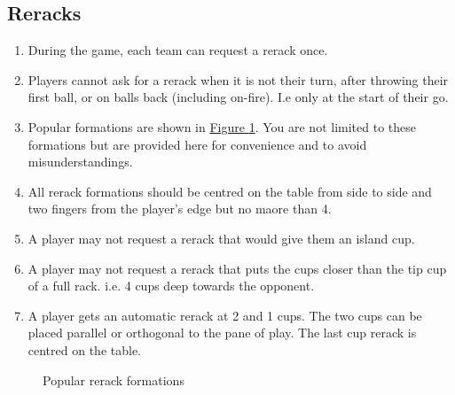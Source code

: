 	\subsection{Reracks}\label{ssec:Rerack}
		\begin{enumerate}[label=(\roman*), ref=\roman*]
            \item \label{sssec:Rerack,number} During the game, each team can request a rerack once.
            \item \label{sssec:Rerack,notallowed} Players cannot ask for a rerack when it is not their turn, after throwing their first ball, or on balls back (including on-fire).
                I.e only at the start of their go.
            \item \label{sssec:Rerack,pop_forms} Popular formations are shown in \hyperref[fig:rerack_forms]{Figure \ref*{fig:rerack_forms}}.
                You are not limited to these formations but are provided here for convenience and to avoid misunderstandings. 
            \item \label{sssec:Rerack,centering} All rerack formations should be centred on the table from side to side and two fingers from the player's edge but no maore than 4.
            \item \label{sssec:Rerack,Island} A player may not request a rerack that would give them an island cup.
            \item \label{sssec:Rerack,4cupdeep} A player may not request a rerack that puts the cups closer than the tip cup of a full rack.
                i.e. 4 cups deep towards the opponent.
            \item \label{sssec:Rerack,autoreracks} A player gets an automatic rerack at 2 and 1 cups.
                The two cups can be placed parallel or orthogonal to the pane of play.
                The last cup rerack is centred on the table.
        \end{enumerate}
        \begin{figure}[H]
            \centering
            \def\svgwidth{0.8\columnwidth}
            
            \caption{Popular rerack formations}
            \label{fig:rerack_forms}
        \end{figure}
